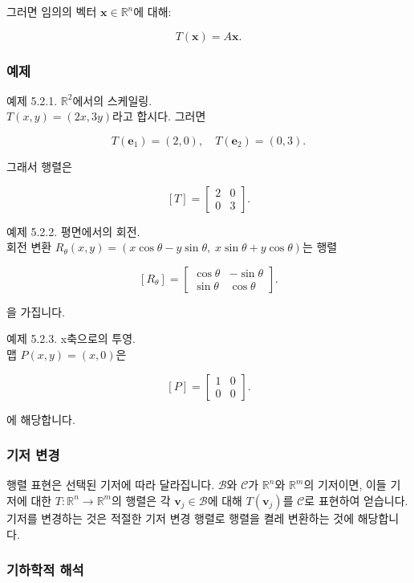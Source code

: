 \documentclass[
  12pt,
  a4paper,
]{article}
\begin{document}
그러면 임의의 벡터 \(\mathbf{x} \in \mathbb{R}^n\)에 대해:

\[T(\mathbf{x}) = A\mathbf{x}.\]

\subsubsection{예제}\label{examples-5}

예제 5.2.1. \(\mathbb{R}^2\)에서의 스케일링.\\
\(T(x,y) = (2x, 3y)\)라고 합시다. 그러면

\[T(\mathbf{e}_1) = (2,0), \quad T(\mathbf{e}_2) = (0,3).\]

그래서 행렬은

\[[T] = \begin{bmatrix}
2 & 0 \\
0 & 3
\end{bmatrix}.\]

예제 5.2.2. 평면에서의 회전.\\
회전 변환 \(R_\theta(x,y) = (x\cos\theta - y\sin\theta, \; x\sin\theta + y\cos\theta)\)는 행렬

\[[R_\theta] = \begin{bmatrix}
\cos\theta & -\sin\theta \\
\sin\theta & \cos\theta
\end{bmatrix}.\]

을 가집니다.

예제 5.2.3. x축으로의 투영.\\
맵 \(P(x,y) = (x,0)\)은

\[[P] = \begin{bmatrix}
1 & 0 \\
0 & 0
\end{bmatrix}.\]

에 해당합니다.

\subsubsection{기저 변경}\label{change-of-basis-2}

행렬 표현은 선택된 기저에 따라 달라집니다. \(\mathcal{B}\)와 \(\mathcal{C}\)가 \(\mathbb{R}^n\)와 \(\mathbb{R}^m\)의 기저이면, 이들 기저에 대한 \(T: \mathbb{R}^n \to \mathbb{R}^m\)의 행렬은 각 \(\mathbf{v}_j \in \mathcal{B}\)에 대해 \(T(\mathbf{v}_j)\)를 \(\mathcal{C}\)로 표현하여 얻습니다. 기저를 변경하는 것은 적절한 기저 변경 행렬로 행렬을 켤레 변환하는 것에 해당합니다.

\subsubsection{기하학적 해석}\label{geometric-interpretation-9}
\end{document}
